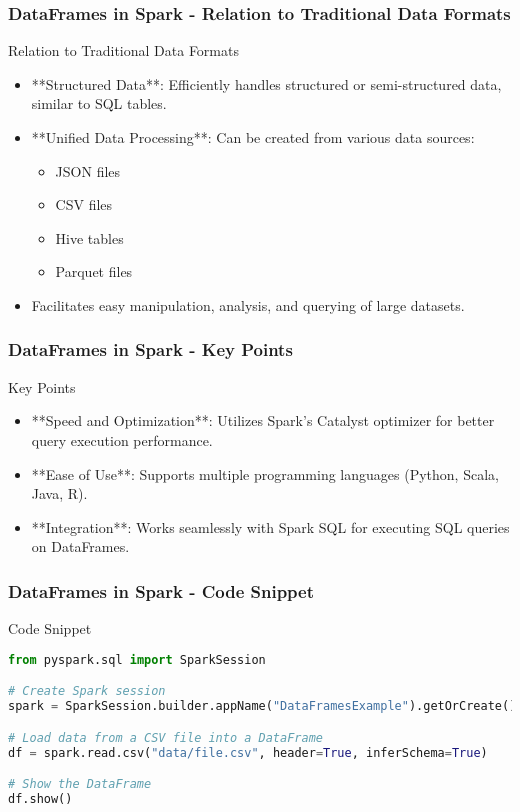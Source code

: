 \documentclass[aspectratio=169]{beamer}
\begin{document}
\begin{frame}[fragile]
    \frametitle{DataFrames in Spark - Relation to Traditional Data Formats}
    \begin{block}{Relation to Traditional Data Formats}
        \begin{itemize}
            \item **Structured Data**: Efficiently handles structured or semi-structured data, similar to SQL tables.
            \item **Unified Data Processing**: Can be created from various data sources:
            \begin{itemize}
                \item JSON files
                \item CSV files
                \item Hive tables
                \item Parquet files
            \end{itemize}
            \item Facilitates easy manipulation, analysis, and querying of large datasets.
        \end{itemize}
    \end{block}
\end{frame}

\begin{frame}[fragile]
    \frametitle{DataFrames in Spark - Key Points}
    \begin{block}{Key Points}
        \begin{itemize}
            \item **Speed and Optimization**: Utilizes Spark’s Catalyst optimizer for better query execution performance.
            \item **Ease of Use**: Supports multiple programming languages (Python, Scala, Java, R).
            \item **Integration**: Works seamlessly with Spark SQL for executing SQL queries on DataFrames.
        \end{itemize}
    \end{block}
\end{frame}

\begin{frame}[fragile]
    \frametitle{DataFrames in Spark - Code Snippet}
    \begin{block}{Code Snippet}
        \begin{lstlisting}[language=Python]
from pyspark.sql import SparkSession

# Create Spark session
spark = SparkSession.builder.appName("DataFramesExample").getOrCreate()

# Load data from a CSV file into a DataFrame
df = spark.read.csv("data/file.csv", header=True, inferSchema=True)

# Show the DataFrame
df.show()
        \end{lstlisting}
    \end{block}
\end{frame}
\end{document}
